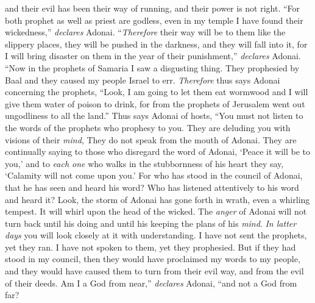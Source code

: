 \begin{biblechapter}
and their evil has been their way of running, 
and their power is not right.
\verse “For both prophet as well as priest are godless, 
even in my temple I have found their wickedness,” \textit{declares} Adonai.
\verse “\textit{Therefore} their way will be to them like the slippery places, 
they will be pushed in the darkness, 
and they will fall into it, 
for I will bring disaster on them in the year of their punishment,” \textit{declares} Adonai.
\verse “Now in the prophets of Samaria I saw a disgusting thing. 
They prophesied by Baal and they caused my people Israel to err.
\verse \textit{Therefore} thus says Adonai concerning the prophets, “Look, I am going to let them eat wormwood 
and I will give them water of poison to drink, 
for from the prophets of Jerusalem 
went out ungodliness to all the land.”
\verse Thus says Adonai of hosts,
\verse “You must not listen to the words of the prophets who prophesy to you. 
They are deluding you with visions of their \textit{mind}, 
They do not speak from the mouth of Adonai.
\verse They are continually saying to those who disregard the word of Adonai, 
‘Peace it will be to you,’ 
and to \textit{each one} who walks in the stubbornness of his heart they say, 
‘Calamity will not come upon you.’
\verse For who has stood in the council of Adonai, 
that he has seen and heard his word? 
Who has listened attentively to his word 
and heard it?
\verse Look, the storm of Adonai has gone forth in wrath, 
even a whirling tempest. 
It will whirl upon the head of the wicked.
\verse The \textit{anger} of Adonai will not turn back 
until his doing and until his keeping the plans of his \textit{mind}. 
\textit{In latter days} you will look closely at it with understanding.
\verse I have not sent the prophets, yet they ran. 
I have not spoken to them, yet they prophesied.
\verse But if they had stood in my council, 
then they would have proclaimed my words to my people, 
and they would have caused them to turn from their evil way, 
and from the evil of their deeds.
\verse Am I a God from near,” \textit{declares} Adonai, 
“and not a God from far?

\end{biblechapter}
